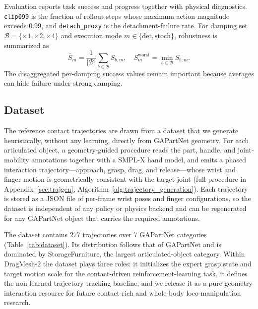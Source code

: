 \documentclass{article}
\begin{document}
Evaluation reports task success and progress together with physical
diagnostics. \texttt{clip099} is the fraction of rollout steps whose
maximum action magnitude exceeds $0.99$, and
\texttt{detach\_proxy} is the detachment-failure rate. For damping
set $\mathcal{B}=\{\times1,\times2,\times4\}$ and execution mode
$m\in\{\mathrm{det},\mathrm{stoch}\}$, robustness is summarized as
\begin{equation}
\bar S_m=\frac{1}{|\mathcal{B}|}\sum_{b\in\mathcal{B}}S_{b,m},
\quad
S^{\mathrm{worst}}_m=\min_{b\in\mathcal{B}}S_{b,m}.
\label{eq:robust_main}
\end{equation}
The disaggregated per-damping success values remain important
because averages can hide failure under strong damping.


\subsection{Dataset}
\label{sec:dataset}

The reference contact trajectories are drawn from a dataset that we
generate heuristically, without any learning, directly from GAPartNet
geometry. For each articulated object, a geometry-guided procedure
reads the part, handle, and joint-mobility annotations together with a
SMPL-X hand model, and emits a phased interaction
trajectory---approach, grasp, drag, and release---whose wrist and
finger motion is geometrically consistent with the target joint (full
procedure in Appendix~\ref{sec:trajgen}, Algorithm~\ref{alg:trajectory_generation}).
Each trajectory is stored as a JSON file of per-frame wrist poses and
finger configurations, so the dataset is independent of any policy or
physics backend and can be regenerated for any GAPartNet object that
carries the required annotations.

The dataset contains $277$ trajectories over $7$ GAPartNet categories
(Table~\ref{tab:dataset}). Its distribution follows that of GAPartNet
and is dominated by StorageFurniture, the largest articulated-object
category. Within DragMesh-2 the dataset plays three roles: it
initializes the expert grasp state and target motion scale for the
contact-driven reinforcement-learning task, it defines the non-learned
trajectory-tracking baseline, and we release it as a pure-geometry
interaction resource for future contact-rich and whole-body
loco-manipulation research.
\end{document}
